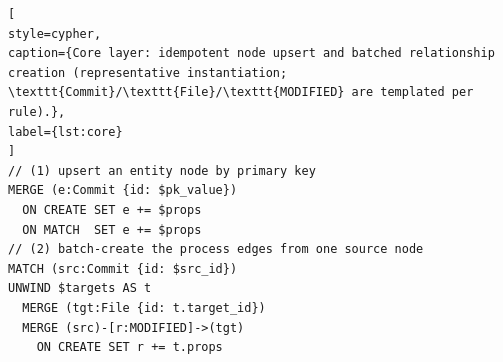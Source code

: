 \documentclass[final,5p,times,twocolumn]{elsarticle}
\theoremstyle{plain}
\begin{document}
\begin{lstlisting}[
style=cypher,
caption={Core layer: idempotent node upsert and batched relationship creation (representative instantiation; \texttt{Commit}/\texttt{File}/\texttt{MODIFIED} are templated per rule).},
label={lst:core}
]
// (1) upsert an entity node by primary key
MERGE (e:Commit {id: $pk_value})
  ON CREATE SET e += $props
  ON MATCH  SET e += $props
// (2) batch-create the process edges from one source node
MATCH (src:Commit {id: $src_id})
UNWIND $targets AS t
  MERGE (tgt:File {id: t.target_id})
  MERGE (src)-[r:MODIFIED]->(tgt)
    ON CREATE SET r += t.props
\end{lstlisting}

\begin{table}[!htbp]\centering\small\setlength{\tabcolsep}{5pt}
\caption{Appendix B: complete hyperparameters, protocol constants, and environment
for KG-Commit. All learned components use class-weighted losses; all statistics are
fit on strictly-past data.}
\label{tab:hyperparams}
\end{table}
\end{document}
